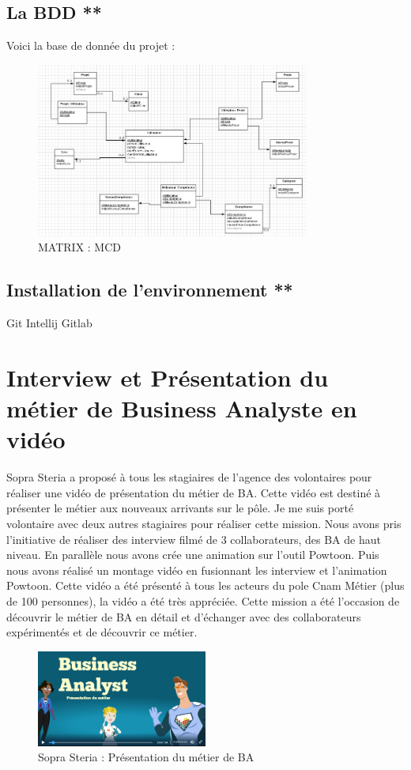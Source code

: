 \subsection{La BDD **}

Voici la base de donnée du projet :
\begin{figure}[H]
\centering
\includegraphics[width=0.8\textwidth]{images/matrix-bdd.png}
\caption{MATRIX : MCD}
\end{figure}

\subsection{Installation de l’environnement **}

Git Intellij Gitlab

\section{Interview et Présentation du métier de Business Analyste en vidéo}

Sopra Steria a proposé à tous les stagiaires de l'agence des volontaires pour réaliser une vidéo de présentation du métier de BA. Cette vidéo est destiné à présenter le métier aux nouveaux arrivants sur le pôle.
Je me suis porté volontaire avec deux autres stagiaires pour réaliser cette mission. 
Nous avons pris l'initiative de réaliser des interview filmé de 3 collaborateurs, des BA de haut niveau. 
En parallèle nous avons crée une animation sur l'outil Powtoon. Puis nous avons réalisé un montage vidéo en fusionnant les interview et l'animation Powtoon. Cette vidéo a été présenté à tous les acteurs du pole Cnam Métier (plus de 100 personnes), la vidéo a été très appréciée. Cette mission a été l'occasion de découvrir le métier de BA en détail et d'échanger avec des collaborateurs expérimentés et de découvrir ce métier.

\begin{figure}[H]
\centering
\includegraphics[width=0.5\textwidth]{images/presBA.png}
\caption{Sopra Steria : Présentation du métier de BA}
\end{figure}
